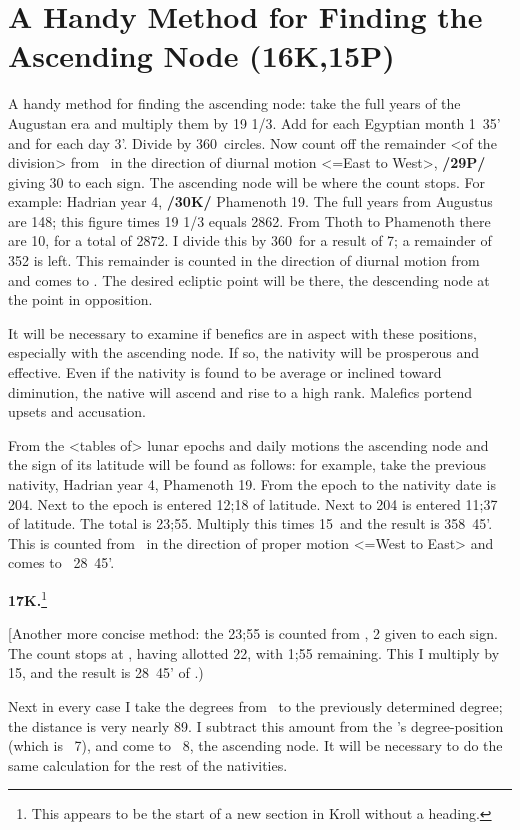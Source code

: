 \section{A Handy Method for Finding the Ascending Node (16K,15P)}

A handy method for finding the ascending node: take the full years of the Augustan era and multiply them by 19 1/3. Add for each Egyptian month 1\deg\, 35' and for each day 3'. Divide by 360\deg\, circles. Now count off the remainder <of the division> from \Cancer\, in the direction of diurnal motion <=East to West>, \textbf{/29P/} giving 30 to each sign. The ascending node will be where the count stops. For example: Hadrian year 4, \textbf{/30K/} Phamenoth 19. The full years from Augustus are 148; this figure times 19 1/3 equals 2862. From Thoth to Phamenoth there are 10\deg, for a total of 2872. I divide this by 360\deg\, for a result of 7; a remainder of 352 is left. This remainder is counted in the direction of diurnal motion from \Cancer\, and comes to \deg. The desired ecliptic point will be there, the descending node at the point in opposition.

\mndl[0.2cm]
It will be necessary to examine if benefics are in aspect with these positions, especially with the ascending node. If so, the nativity will be prosperous and effective. Even if the nativity is found to be average or inclined toward diminution, the native will ascend and rise to a high rank. Malefics portend
upsets and accusation.

From the <tables of> lunar epochs and daily motions the ascending node and the sign of its latitude will be found as follows: for example, take the previous nativity, Hadrian year 4, Phamenoth 19. From the epoch to the nativity date is 204. Next to the epoch is entered 12;18 of latitude. Next to 204 is entered 11;37 of latitude. The total is 23;55. Multiply this times 15\deg\, and the result is 358\deg\, 45'. This is counted from \Leo\, in the direction of proper motion <=West to East> and comes to \Cancer\, 28\deg\, 45'.

\textbf{17K.}\footnote{This appears to be the start of a new section in Kroll without a heading.}
\setcounter{section}{17}

[Another more concise method: the 23;55 is counted from \Leo, 2 given to each sign. The count stops at \Gemini, having allotted 22, with 1;55 remaining. This I multiply by 15\deg, and the result is 28\deg\, 45' of \Cancer.)

Next in every case I take the degrees from \Taurus\, to the previously determined degree; the distance is very nearly 89\deg. I subtract this amount from the \Moon’s degree-position (which is \Scorpio\, 7\deg), and come to \Leo\, 8\deg, the ascending node. It will be necessary to do the same calculation for the rest of the nativities.

